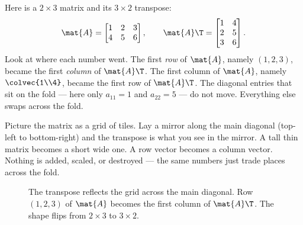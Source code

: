 Here is a $2\times 3$ matrix and its $3\times 2$ transpose:
\[
  \mat{A} = \begin{bmatrix} 1 & 2 & 3 \\ 4 & 5 & 6 \end{bmatrix},
  \qquad
  \mat{A}\T = \begin{bmatrix} 1 & 4 \\ 2 & 5 \\ 3 & 6 \end{bmatrix}.
\]
Look at where each number went. The first \emph{row} of $\mat{A}$, namely $(1,2,3)$, became the first
\emph{column} of $\mat{A}\T$. The first column of $\mat{A}$, namely $\colvec{1\\4}$, became the first
row of $\mat{A}\T$. The diagonal entries that sit on the fold --- here only $a_{11}=1$ and $a_{22}=5$ ---
do not move. Everything else swaps across the fold.

\begin{intuitionbox}
Picture the matrix as a grid of tiles. Lay a mirror along the main diagonal (top-left to
bottom-right) and the transpose is what you see in the mirror. A tall thin matrix becomes a short
wide one. A row vector becomes a column vector. Nothing is added, scaled, or destroyed --- the same
numbers just trade places across the fold.
\end{intuitionbox}

\begin{figure}[H]
\centering
{}
\caption{The transpose reflects the grid across the main diagonal. Row $(1,2,3)$ of $\mat{A}$
becomes the first column of $\mat{A}\T$. The shape flips from $2\times 3$ to $3\times 2$.}
\label{ch10:fig-flip}
\end{figure}

